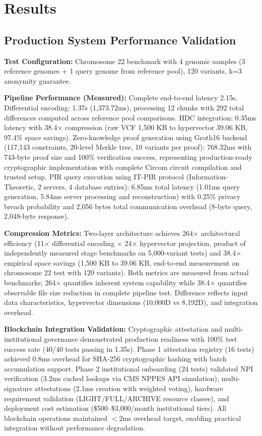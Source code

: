 \documentclass[11pt,letterpaper]{article}
\begin{document}
\section{Results}

\subsection{Production System Performance Validation}

\textbf{Test Configuration:} Chromosome 22 benchmark with 4 genomic samples (3 reference genomes + 1 query genome from reference pool), 120 variants, k=3 anonymity guarantee.

\textbf{Pipeline Performance (Measured):} Complete end-to-end latency 2.15s. Differential encoding: 1.37s (1,373.72ms), processing 12 chunks with 292 total differences computed across reference pool comparisons. HDC integration: 0.35ms latency with 38.4$\times$ compression (raw VCF 1,500 KB to hypervector 39.06 KB, 97.4\% space savings). Zero-knowledge proof generation using Groth16 backend (117,143 constraints, 20-level Merkle tree, 10 variants per proof): 768.32ms with 743-byte proof size and 100\% verification success, representing production-ready cryptographic implementation with complete Circom circuit compilation and trusted setup. PIR query execution using IT-PIR protocol (Information-Theoretic, 2 servers, 4 database entries): 6.85ms total latency (1.01ms query generation, 5.84ms server processing and reconstruction) with 0.25\% privacy breach probability and 2,056 bytes total communication overhead (8-byte query, 2,048-byte response).

\textbf{Compression Metrics:} Two-layer architecture achieves 264$\times$ architectural efficiency (11$\times$ differential encoding $\times$ 24$\times$ hypervector projection, product of independently measured stage benchmarks on 5,000-variant tests) and 38.4$\times$ empirical space savings (1,500 KB to 39.06 KB, end-to-end measurement on chromosome 22 test with 120 variants). Both metrics are measured from actual benchmarks; 264$\times$ quantifies inherent system capability while 38.4$\times$ quantifies observable file size reduction in complete pipeline test. Difference reflects input data characteristics, hypervector dimensions (10,000D vs 8,192D), and integration overhead.

\textbf{Blockchain Integration Validation:} Cryptographic attestation and multi-institutional governance demonstrated production readiness with 100\% test success rate (40/40 tests passing in 1.35s). Phase 1 attestation registry (16 tests) achieved 0.8ms overhead for SHA-256 cryptographic hashing with batch accumulation support. Phase 2 institutional onboarding (24 tests) validated NPI verification (3.2ms cached lookups via CMS NPPES API simulation), multi-signature attestations (2.1ms creation with weighted voting), hardware requirement validation (LIGHT/FULL/ARCHIVE resource classes), and deployment cost estimation (\$500--\$3,000/month institutional tiers). All blockchain operations maintained $<$2ms overhead target, enabling practical integration without performance degradation.
\end{document}
